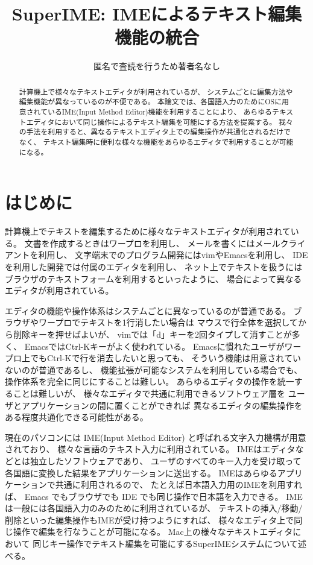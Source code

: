 \documentclass[twoside]{wiss}
\def\system{SuperIME}
\def\papertitle{\system: IMEによるテキスト編集機能の統合}
\begin{document}
\title{\papertitle}
\etitle{}%
%
%
%
\author{匿名で査読を行うため著者名なし
	}

\begin{abstract}
計算機上で様々なテキストエディタが利用されているが、
システムごとに編集方法や編集機能が異なっているのが不便である。
本論文では、各国語入力のためにOSに用意されているIME(Input Method Editor)機能を利用することにより、
あらゆるテキストエディタにおいて同じ操作によるテキスト編集を可能にする方法を提案する。
我々の手法を利用すると、異なるテキストエディタ上での編集操作が共通化されるだけでなく、
テキスト編集時に便利な様々な機能をあらゆるエディタで利用することが可能になる。

\end{abstract}

\maketitle

\section{はじめに}

計算機上でテキストを編集するために様々なテキストエディタが利用されている。
文書を作成するときはワープロを利用し、
メールを書くにはメールクライアントを利用し、
文字端末でのプログラム開発にはvimやEmacsを利用し、
IDEを利用した開発では付属のエディタを利用し、
ネット上でテキストを扱うにはブラウザのテキストフォームを利用するといったように、
場合によって異なるエディタが利用されている。

エディタの機能や操作体系はシステムごとに異なっているのが普通である。
ブラウザやワープロでテキストを1行消したい場合は
マウスで行全体を選択してから削除キーを押せばよいが、
vimでは「d」キーを2回タイプして消すことが多く、
EmacsではCtrl-Kキーがよく使われている。
Emacsに慣れたユーザがワープロ上でもCtrl-Kで行を消去したいと思っても、
そういう機能は用意されていないのが普通であるし、
機能拡張が可能なシステムを利用している場合でも、
操作体系を完全に同じにすることは難しい。
%
あらゆるエディタの操作を統一することは難しいが、
様々なエディタで共通に利用できるソフトウェア層を
ユーザとアプリケーションの間に置くことができれば
異なるエディタの編集操作をある程度共通化できる可能性がある。

現在のパソコンには IME(Input Method Editor) と呼ばれる文字入力機構が用意されており、
様々な言語のテキスト入力に利用されている。
IMEはエディタなどとは独立したソフトウェアであり、
ユーザのすべてのキー入力を受け取って
各国語に変換した結果をアプリケーションに送出する。
IMEはあらゆるアプリケーションで共通に利用されるので、
たとえば日本語入力用のIMEを利用すれば、
Emacs でもブラウザでも IDE でも同じ操作で日本語を入力できる。
IMEは一般には各国語入力のみのために利用されているが、
テキストの挿入/移動/削除といった編集操作もIMEが受け持つようにすれば、
様々なエディタ上で同じ操作で編集を行なうことが可能になる。
%
Mac上の様々なテキストエディタにおいて
同じキー操作でテキスト編集を可能にする{\system}システムについて述べる。
\end{document}
